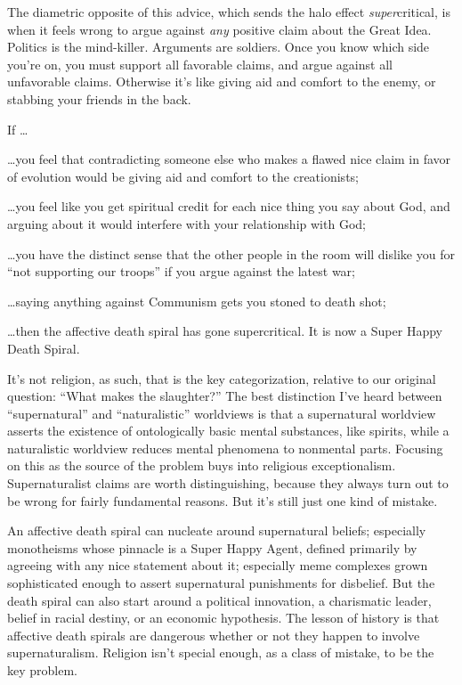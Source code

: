 {
 The diametric opposite of this advice, which sends the halo effect
\textit{super}critical, is when it feels wrong to argue against
\textit{any} positive claim about the Great Idea. Politics is the
mind-killer. Arguments are soldiers. Once you know which side
you're on, you must support all favorable claims, and
argue against all unfavorable claims. Otherwise it's
like giving aid and comfort to the enemy, or stabbing your friends in
the back.}

{
 If \ldots}

{
 \ldots you feel that contradicting someone else who makes a flawed
nice claim in favor of evolution would be giving aid and comfort to the
creationists;}

{
 \ldots you feel like you get spiritual credit for each nice thing
you say about God, and arguing about it would interfere with your
relationship with God;}

{
 \ldots you have the distinct sense that the other people in the
room will dislike you for ``not supporting our
troops'' if you argue against the latest war;}

{
 \ldots saying anything against Communism gets you stoned to death
shot;}

{
 \ldots then the affective death spiral has gone supercritical. It
is now a Super Happy Death Spiral.}

{
 It's not religion, as such, that is the key
categorization, relative to our original question:
``What makes the slaughter?'' The
best distinction I've heard between
``supernatural'' and
``naturalistic'' worldviews is that
a supernatural worldview asserts the existence of ontologically basic
mental substances, like spirits, while a naturalistic worldview reduces
mental phenomena to nonmental parts. Focusing on this as the source of
the problem buys into religious exceptionalism. Supernaturalist claims
are worth distinguishing, because they always turn out to be wrong for
fairly fundamental reasons. But it's still just one
kind of mistake.}

{
 An affective death spiral can nucleate around supernatural
beliefs; especially monotheisms whose pinnacle is a Super Happy Agent,
defined primarily by agreeing with any nice statement about it;
especially meme complexes grown sophisticated enough to assert
supernatural punishments for disbelief. But the death spiral can also
start around a political innovation, a charismatic leader, belief in
racial destiny, or an economic hypothesis. The lesson of history is
that affective death spirals are dangerous whether or not they happen
to involve supernaturalism. Religion isn't special
enough, as a class of mistake, to be the key problem.}

